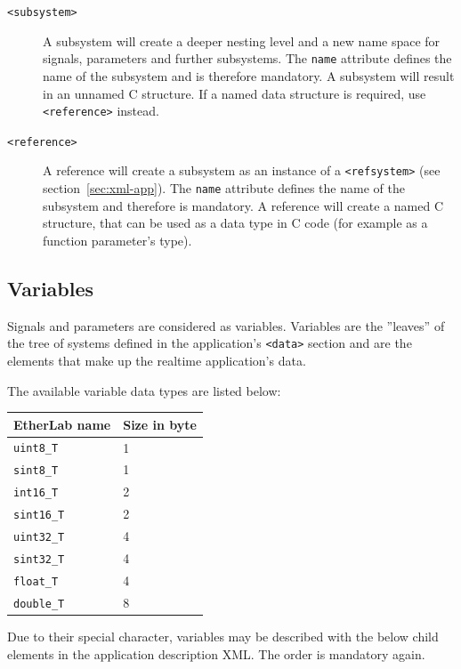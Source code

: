 \begin{description}
\item[\small\texttt{<subsystem>}] A subsystem will create a deeper nesting
level and a new name space for signals, parameters and further subsystems. The
\texttt{name} attribute defines the name of the subsystem and is therefore
mandatory. A subsystem will result in an unnamed C structure. If a named data
structure is required, use \texttt{<reference>} instead.

\item[\small\texttt{<reference>}] A reference will create a subsystem as an
instance of a \texttt{<refsystem>} (see section~\ref{sec:xml-app}). The
\texttt{name} attribute defines the name of the subsystem and therefore is
mandatory. A reference will create a named C structure, that can be used as a
data type in C code (for example as a function parameter's type).

\end{description}

\subsection{Variables}
\label{sec:vars}

Signals and parameters are considered as variables. Variables are the
''leaves'' of the tree of systems defined in the application's \texttt{<data>}
section and are the elements that make up the realtime application's data.

The available variable data types are listed below:

\begin{center}
\begin{tabular}{|l|l|}
EtherLab name & Size in byte\\\hline\hline
\lstinline+uint8_T+ & 1\\
\lstinline+sint8_T+ & 1\\
\lstinline+int16_T+ & 2\\
\lstinline+sint16_T+ & 2\\
\lstinline+uint32_T+ & 4\\
\lstinline+sint32_T+ & 4\\
\lstinline+float_T+ & 4\\
\lstinline+double_T+ & 8\\\hline
\end{tabular}
\end{center}

Due to their special character, variables may be described with the below
child elements in the application description XML. The order is mandatory
again.

